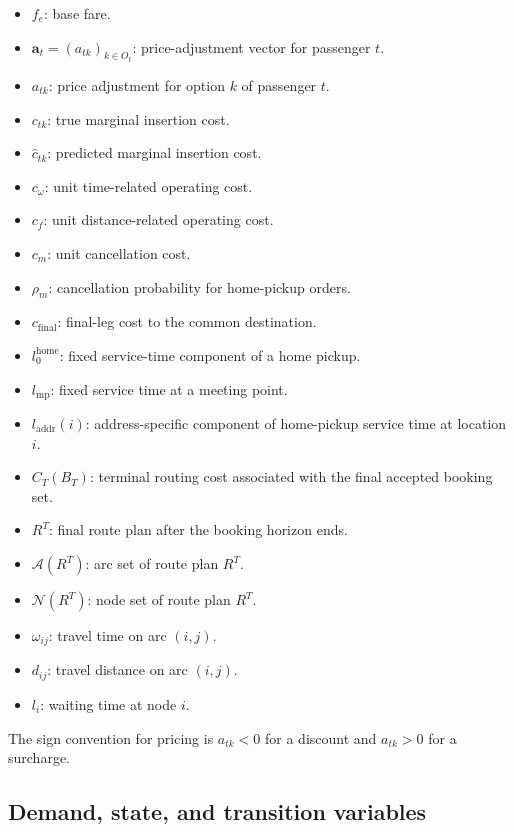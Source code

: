 \documentclass[preprint,12pt,authoryear]{elsarticle}
\begin{document}
\begin{itemize}
\item $f_e$: base fare.
\item $\mathbf{a}_t=(a_{tk})_{k\in O_t}$: price-adjustment vector for passenger $t$.
\item $a_{tk}$: price adjustment for option $k$ of passenger $t$.
\item $c_{tk}$: true marginal insertion cost.
\item $\hat{c}_{tk}$: predicted marginal insertion cost.
\item $c_{\omega}$: unit time-related operating cost.
\item $c_f$: unit distance-related operating cost.
\item $c_m$: unit cancellation cost.
\item $\rho_m$: cancellation probability for home-pickup orders.
\item $c_{\text{final}}$: final-leg cost to the common destination.
\item $l_0^{\mathrm{home}}$: fixed service-time component of a home pickup.
\item $l_{\mathrm{mp}}$: fixed service time at a meeting point.
\item $l_{\mathrm{addr}}(i)$: address-specific component of home-pickup service time at location $i$.
\item $C_T(B_T)$: terminal routing cost associated with the final accepted booking set.
\item $R^T$: final route plan after the booking horizon ends.
\item $\mathcal{A}(R^T)$: arc set of route plan $R^T$.
\item $\mathcal{N}(R^T)$: node set of route plan $R^T$.
\item $\omega_{ij}$: travel time on arc $(i,j)$.
\item $d_{ij}$: travel distance on arc $(i,j)$.
\item $l_i$: waiting time at node $i$.
\end{itemize}

The sign convention for pricing is $a_{tk}<0$ for a discount and $a_{tk}>0$ for a surcharge.

\subsection{Demand, state, and transition variables}
\end{document}

